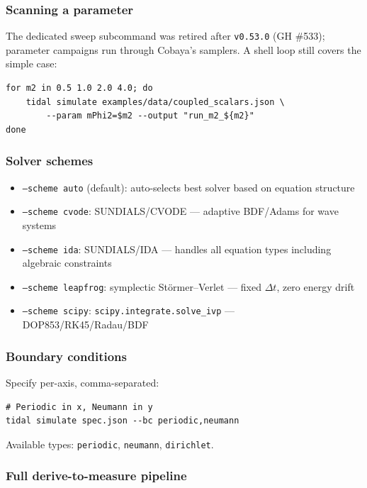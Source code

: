 \subsubsection{Scanning a parameter}

The dedicated sweep subcommand was retired after \texttt{v0.53.0} (GH \#533);
parameter campaigns run through Cobaya's samplers.  A shell loop still covers
the simple case:

\begin{lstlisting}[style=bash]
for m2 in 0.5 1.0 2.0 4.0; do
    tidal simulate examples/data/coupled_scalars.json \
        --param mPhi2=$m2 --output "run_m2_${m2}"
done
\end{lstlisting}

\subsubsection{Solver schemes}

\begin{itemize}
  \item \texttt{--scheme auto} (default): auto-selects best solver based on equation structure
  \item \texttt{--scheme cvode}: SUNDIALS/CVODE --- adaptive BDF/Adams for wave systems
  \item \texttt{--scheme ida}: SUNDIALS/IDA --- handles all equation types including algebraic constraints
  \item \texttt{--scheme leapfrog}: symplectic St\"ormer--Verlet --- fixed $\Delta t$, zero energy drift
  \item \texttt{--scheme scipy}: \texttt{scipy.integrate.solve\_ivp} --- DOP853/RK45/Radau/BDF
\end{itemize}

\subsubsection{Boundary conditions}

Specify per-axis, comma-separated:

\begin{lstlisting}[style=bash]
# Periodic in x, Neumann in y
tidal simulate spec.json --bc periodic,neumann
\end{lstlisting}

Available types: \texttt{periodic}, \texttt{neumann}, \texttt{dirichlet}.

\subsubsection{Full derive-to-measure pipeline}


